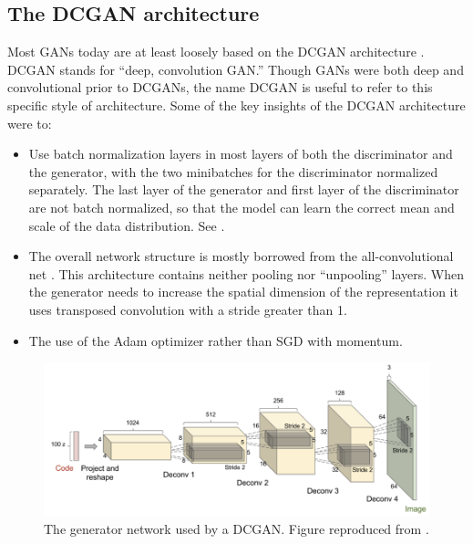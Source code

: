 \subsection{The DCGAN architecture}

Most GANs today are at least loosely based on the DCGAN architecture \citep{radford2015unsupervised}.
DCGAN stands for ``deep, convolution GAN.'' Though GANs were both deep and convolutional prior to
DCGANs, the name DCGAN is useful to refer to this specific style of architecture.
Some of the key insights of the DCGAN architecture were to:
\begin{itemize}
  \item Use batch normalization layers in most layers of both the discriminator and the generator,
        with the two minibatches for the discriminator normalized separately.
        The last layer of the generator and first layer of the discriminator are not batch normalized,
        so that the model can learn the correct mean and scale of the data distribution.
        See .
  \item The overall network structure is mostly borrowed from the all-convolutional net \citep{Springenberg2015}.
        This architecture contains neither pooling nor ``unpooling'' layers.
        When the generator needs to increase the spatial dimension of the representation
        it uses transposed convolution with a stride greater than 1.
  \item The use of the Adam optimizer rather than SGD with momentum.
\end{itemize}

\begin{figure}
\centering
\includegraphics[width=\textwidth]{dcgan}
  \caption{The generator network used by a DCGAN. Figure reproduced from \citet{radford2015unsupervised}.}
\label{fig:dcgan}
\end{figure}

